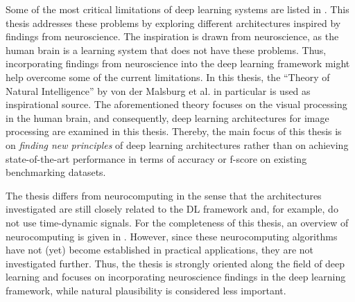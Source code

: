 Some of the most critical limitations of deep learning systems are listed in .
This thesis addresses these problems by exploring different architectures inspired by findings from neuroscience.
The inspiration is drawn from neuroscience, as the human brain is a learning system that does not have these problems. Thus, incorporating findings from neuroscience into the deep learning framework might help overcome some of the current limitations.
In this thesis, the ``Theory of Natural Intelligence'' by von der Malsburg et al.  in particular is used as inspirational source.
The aforementioned theory focuses on the visual processing in the human brain, and consequently, deep learning architectures for image processing are examined in this thesis.
Thereby, the main focus of this thesis is on \emph{finding new principles} of deep learning architectures rather than on achieving state-of-the-art performance in terms of accuracy or f-score on existing benchmarking datasets.

The thesis differs from neurocomputing in the sense that the architectures investigated are still closely related to the DL framework and, for example, do not use time-dynamic signals. 
For the completeness of this thesis, an overview of neurocomputing is given in .
However, since these neurocomputing algorithms have not (yet) become established in practical applications, they are not investigated further.
Thus, the thesis is strongly oriented along the field of deep learning and focuses on incorporating neuroscience findings in the deep learning framework, while natural plausibility is considered less important.


